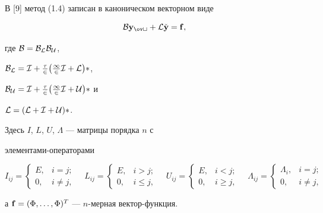 \begin{pf}


В [9] метод (1.4) записан в каноническом векторном виде


\begin{equation}


\cal B{\bold y}_{\ov t}+\cal L\Check{\bold y}=\bold f,


\end{equation}


где $\cal B=\cal B_L\cal B_U$,


$\cal B_L=I+\frac{\tau}{2}\big(\frac{1}{2}I+L\big)\Lambda$,


$\cal B_U=I+\frac{\tau}{2}\big(\frac{1}{2}I+U\big)\Lambda$ и


$\cal L=(L+I+U)\Lambda$.


Здесь $I$, $L$, $U$, $\Lambda$ --- матрицы порядка $n$ с


элементами-операторами


$$


I_{ij}=\begin{cases}


E,& i=j;\\


0,& i\ne j,


\end{cases} \quad


L_{ij}=\begin{cases}


E,& i>j;\\


0,& i\leqslant j,


\end{cases} \quad


U_{ij}=\begin{cases}


E,& i<j;\\


0,& i\geqslant j,


\end{cases} \quad


\Lambda_{ij}=\begin{cases}


\Lambda_i,& i=j;\\


0,& i\ne j,


\end{cases}


$$


а ${\bold f}=(\Phi,\dotsc,\Phi)^T$ --- $n$-мерная вектор-функция. 



\end{pf}
